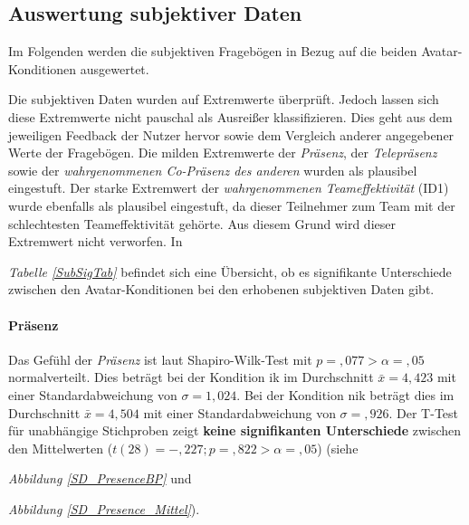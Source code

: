 \documentclass[a4paper,11pt]{article}%
\renewcommand{\\}{\vspace*{0.5\baselineskip} \newline}
\begin{document}
{{{{{{{{{{{%

\newpage
\subsection{Auswertung subjektiver Daten}
Im Folgenden werden die subjektiven Fragebögen in Bezug auf die beiden Avatar-Konditionen ausgewertet.

Die subjektiven Daten wurden auf Extremwerte überprüft. Jedoch lassen sich diese Extremwerte nicht pauschal als Ausreißer klassifizieren. Dies geht aus dem jeweiligen Feedback der Nutzer hervor sowie dem Vergleich anderer angegebener Werte der Fragebögen. Die milden Extremwerte der \textit{Präsenz}, der \textit{Telepräsenz} sowie der \textit{wahrgenommenen Co-Präsenz des anderen} wurden als plausibel eingestuft. 
Der starke Extremwert der \textit{wahrgenommenen Teameffektivität} (ID1) wurde ebenfalls als plausibel eingestuft, da dieser Teilnehmer zum Team mit der schlechtesten Teameffektivität gehörte. Aus diesem Grund wird dieser Extremwert nicht verworfen.
In {\textit{Tabelle \ref{SubSigTab}} befindet sich eine Übersicht, ob es signifikante Unterschiede zwischen den Avatar-Konditionen bei den erhobenen subjektiven Daten gibt.

\paragraph{Präsenz}
Das Gefühl der \textit{Präsenz} ist laut Shapiro-Wilk-Test mit $p =,077 > \alpha = ,05$ normalverteilt. 
Dies beträgt bei der Kondition \ac{ik} im Durchschnitt $\bar{x} = 4,423$ mit einer Standardabweichung von $\sigma = 1,024$.
Bei der Kondition \ac{nik} beträgt dies im Durchschnitt $\bar{x} = 4,504$ mit einer Standardabweichung von $\sigma =,926$.
Der T-Test für unabhängige Stichproben zeigt \textbf{keine signifikanten Unterschiede} zwischen den Mittelwerten ($t(28) = -,227; p =,822 > \alpha = ,05$) (siehe {\textit{Abbildung \ref{SD_PresenceBP}} und {\textit{Abbildung \ref{SD_Presence_Mittel}}).

}}}}}}}}}}}}}}
\end{document}
